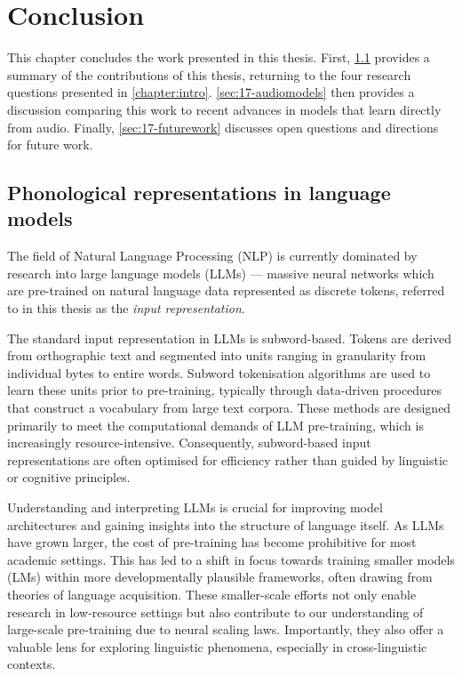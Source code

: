 \chapter{Conclusion}\label{chapter:conclusion}

This chapter concludes the work presented in this thesis. First, \cref{sec:17-summary} provides a summary of the contributions of this thesis, returning to the four research questions presented in \cref{chapter:intro}. \cref{sec:17-audiomodels} then provides a discussion comparing this work to recent advances in models that learn directly from audio. Finally, \cref{sec:17-futurework} discusses open questions and directions for future work.

\section{Phonological representations in language models}
\label{sec:17-summary}

The field of Natural Language Processing (NLP) is currently dominated by research into large language models (LLMs) --- massive neural networks which are pre-trained on natural language data represented as discrete tokens, referred to in this thesis as the \emph{input representation}.

The standard input representation in LLMs is subword-based. Tokens are derived from orthographic text and segmented into units ranging in granularity from individual bytes to entire words. Subword tokenisation algorithms are used to learn these units prior to pre-training, typically through data-driven procedures that construct a vocabulary from large text corpora. These methods are designed primarily to meet the computational demands of LLM pre-training, which is increasingly resource-intensive. Consequently, subword-based input representations are often optimised for efficiency rather than guided by linguistic or cognitive principles.

Understanding and interpreting LLMs is crucial for improving model architectures and gaining insights into the structure of language itself. As LLMs have grown larger, the cost of pre-training has become prohibitive for most academic settings. This has led to a shift in focus towards training smaller models (LMs) within more developmentally plausible frameworks, often drawing from theories of language acquisition. These smaller-scale efforts not only enable research in low-resource settings but also contribute to our understanding of large-scale pre-training due to neural scaling laws. Importantly, they also offer a valuable lens for exploring linguistic phenomena, especially in cross-linguistic contexts.

